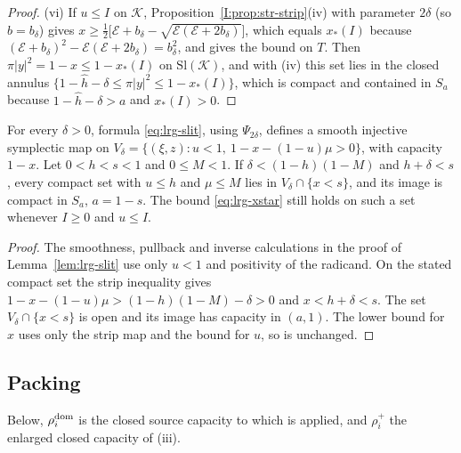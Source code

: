 \begin{proof}
(vi) If $u\le I$ on $\mathcal K$, Proposition~\ref{I:prop:str-strip}(iv) with parameter $2\delta$ (so $b=b_\delta$) gives
$x\ge\frac12\bigl[\mathcal E+b_\delta-\sqrt{\mathcal E(\mathcal E+2b_\delta)}\bigr]$, which equals $x_*(I)$ because
$(\mathcal E+b_\delta)^2-\mathcal E(\mathcal E+2b_\delta)=b_\delta^2$, and gives the bound on $T$. Then $\pi|y|^2=1-x\le1-x_*(I)$ on
$\mathrm{Sl}(\mathcal K)$, and with (iv) this set lies in the closed annulus $\{1-\hat h-\delta\le\pi|y|^2\le1-x_*(I)\}$, which is compact
and contained in $S_a$ because $1-\hat h-\delta>a$ and $x_*(I)>0$.
\end{proof}

\begin{proposition}\label{prop:lrg-slit-domain}
For every $\delta>0$, formula \eqref{eq:lrg-slit}, using $\Psi_{2\delta}$, defines a smooth injective symplectic
map on $V_\delta=\{(\xi,z):u<1,\ 1-x-(1-u)\mu>0\}$, with capacity $1-x$. Let $0<h<s<1$ and $0\le M<1$. If
$\delta<(1-h)(1-M)$ and $h+\delta<s$, every compact set with $u\le h$ and $\mu\le M$ lies in $V_\delta\cap\{x<s\}$,
and its image is compact in $S_a$, $a=1-s$. The bound \eqref{eq:lrg-xstar} still holds on such a set whenever $I\ge0$ and $u\le I$.
\end{proposition}

\begin{proof}
The smoothness, pullback and inverse calculations in the proof of Lemma~\ref{lem:lrg-slit} use only $u<1$ and
positivity of the radicand. On the stated compact set the strip inequality gives $1-x-(1-u)\mu>(1-h)(1-M)-\delta>0$
and $x<h+\delta<s$. The set $V_\delta\cap\{x<s\}$ is open and its image has capacity in $(a,1)$. The lower bound for
$x$ uses only the strip map and the bound for $u$, so is unchanged.
\end{proof}

\subsection{Packing}\label{sec:two-packing}

Below, $\rho_i^{\rm dom}$ is the closed source capacity to which  is applied, and
$\rho_i^+$ the enlarged closed capacity of (iii).


